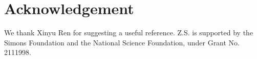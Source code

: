 \documentclass[11pt]{article}
\theoremstyle{definition}
\begin{document}
\section*{Acknowledgement}
We thank Xinyu Ren for suggesting a useful reference.
Z.S. is supported by the Simons Foundation and the National Science Foundation, under Grant No. 2111998. 




\begin{comment}
\section{Mixture of Gaussians and the EM algorithm}

We are given a training set $\{x^{(1)}, ... , x^{(n)}\}$ consisting of $n$ independent examples. We have a latent variable model $p(x, z|\theta)$ with $z$ being the latenet variable (which for simplicity is assumed to take finite number of values). The density for $x$ can be obtained by marginalized over the latent variable $z$:

\begin{equation}
    p(x;\theta) = \sum_z p(x, z;\theta).
\end{equation}

We wish to fit the parameters $\theta$ by maximizing the log-likelihood of the data, defined by

\begin{equation}
    l(\theta) = \sum_{i=1}^n \log p(x^{(i)};\theta)
    = \sum_{i=1}^n \log \sum_{z^{(i)}} p(x^{(i)}, z^{(i)};\theta).
\end{equation}

We introduce $n$ distributions $Q_1, Q_2, ... , Q_n$, one for each example $x^{(i)}$. The EM algorithm:

Repeat until convergence:

E-step: for each $i$, set
\begin{equation}
    Q_i^{(t)}(z^{(i)}) := p(z^{(i)}|x^{(i)}; \theta^{(t)}).
\end{equation}

M-step: set

\begin{equation}
    \theta^{(t+1)} := \arg \max_{\theta} \sum_i \sum_{z^{(i)}}
    Q_i^{(t)}(z^{(i)}) \log \frac{p(x^{(i)},z^{(i)};\theta)}{Q_i^{(t)}(z^{(i)})}.
\end{equation}

\section{Semi-Supervised EM}


\end{comment}
\end{document}
